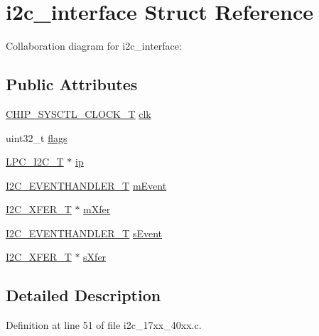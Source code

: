 \hypertarget{structi2c__interface}{}\section{i2c\+\_\+interface Struct Reference}
\label{structi2c__interface}


Collaboration diagram for i2c\+\_\+interface\+:
\subsection*{Public Attributes}
\begin{DoxyCompactItemize}
\item 
\hyperlink{group__CLOCK__17XX__40XX_ga82e75cbe777e79f448fec3987ddd978e}{C\+H\+I\+P\+\_\+\+S\+Y\+S\+C\+T\+L\+\_\+\+C\+L\+O\+C\+K\+\_\+T} \hyperlink{structi2c__interface_a98a5ec32b8f77360ac136e09db8a9821}{clk}
\item 
uint32\+\_\+t \hyperlink{structi2c__interface_a8b1e70d8de79970bd3e61e67e59e15a2}{flags}
\item 
\hyperlink{structLPC__I2C__T}{L\+P\+C\+\_\+\+I2\+C\+\_\+T} $\ast$ \hyperlink{structi2c__interface_a3081afc519201026e2c06217a5c71eef}{ip}
\item 
\hyperlink{group__I2C__17XX__40XX_gaef152f4dc1487d90573810007489082e}{I2\+C\+\_\+\+E\+V\+E\+N\+T\+H\+A\+N\+D\+L\+E\+R\+\_\+T} \hyperlink{structi2c__interface_ac9762dcaee633a0121320763422eabdf}{m\+Event}
\item 
\hyperlink{structI2C__XFER__T}{I2\+C\+\_\+\+X\+F\+E\+R\+\_\+T} $\ast$ \hyperlink{structi2c__interface_a8894534cc883275b847f183e6fe1e7e6}{m\+Xfer}
\item 
\hyperlink{group__I2C__17XX__40XX_gaef152f4dc1487d90573810007489082e}{I2\+C\+\_\+\+E\+V\+E\+N\+T\+H\+A\+N\+D\+L\+E\+R\+\_\+T} \hyperlink{structi2c__interface_aa0820cc1e59b1da898435b4813f5c58d}{s\+Event}
\item 
\hyperlink{structI2C__XFER__T}{I2\+C\+\_\+\+X\+F\+E\+R\+\_\+T} $\ast$ \hyperlink{structi2c__interface_a891a1ea53436714c117aaa2d0917e9f2}{s\+Xfer}
\end{DoxyCompactItemize}


\subsection{Detailed Description}


Definition at line 51 of file i2c\+\_\+17xx\+\_\+40xx.\+c.



